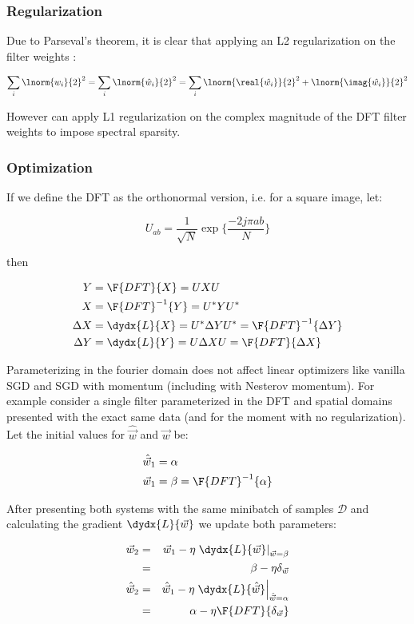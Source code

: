\subsubsection{Regularization}
Due to Parseval's theorem, it is clear that applying an L2 regularization on the
filter weights :

$$\sum_i \lnorm{w_i}{2}^2 = \sum_i \lnorm{\hat{w}_i}{2}^2 = \sum_i
  \lnorm{\real{\hat{w_i}}}{2}^2 + \lnorm{\imag{\hat{w_i}}}{2}^2 $$

However can apply L1 regularization on the complex magnitude of the DFT filter
weights to impose spectral sparsity.

\subsubsection{Optimization}
If we define the DFT as the orthonormal version, i.e. for a square image, let:

$$ U_{ab} = \frac{1}{\sqrt{N}} \exp\{ \frac{-2j\pi ab}{N} \} $$

then

\begin{align}
  Y &= \F{DFT}\{ X \} = UXU \\
  X &= \F{DFT}^{-1} \{ Y \} = U^*YU^* \\
  \Delta X &= \dydx{L}{X} = U^* \Delta Y U^* = \F{DFT}^{-1} \{\Delta Y \}\\
  \Delta Y &= \dydx{L}{Y} = U \Delta X U = \F{DFT} \{\Delta X \}
\end{align}

Parameterizing in the fourier domain does not affect linear optimizers like
vanilla SGD and SGD with momentum (including with Nesterov momentum). 
For example consider a single filter
parameterized in the DFT and spatial domains presented with the exact same data
(and for the moment with no regularization). Let the initial values for 
$\hat{\vec{w}}$ and $\vec{w}$ be:

\begin{align}
  \hat{\vec{w}}_1 &= \alpha \\
  \vec{w}_1 &= \beta = \F{DFT}^{-1}\{\alpha\} 
\end{align}

After presenting both systems with the same minibatch of samples $\mathcal{D}$
and calculating the gradient $\dydx{L}{\vec{w}}$ we update both parameters:

\begin{eqnarray*}
  \vec{w}_2 & = & \vec{w}_1 - \eta \left. \dydx{L}{\vec{w}} \right|_{\vec{w} = \beta} \\
            & = & \beta - \eta \delta_{\vec{w}}  \\
  \hat{\vec{w}}_2 & = & \hat{\vec{w}}_1 - \eta \left. \dydx{L}{\hat{\vec{w}}} \right|_{ \hat{\vec{w}} = \alpha}  \\
                  & = & \alpha - \eta \F{DFT} \{ \delta_{\vec{w}} \} 
\end{eqnarray*}

